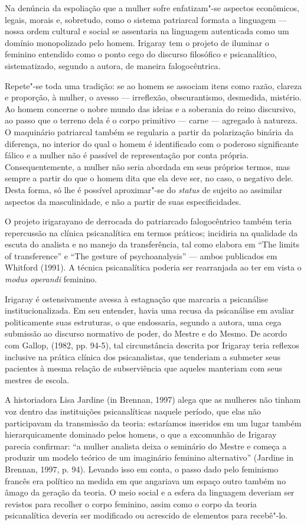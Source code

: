 Na denúncia da espoliação que a mulher sofre enfatizam"-se aspectos
econômicos, legais, morais e, sobretudo, como o sistema patriarcal
formata a linguagem --- nossa ordem cultural e social se assentaria na
linguagem autenticada como um domínio monopolizado pelo homem. Irigaray
tem o projeto de iluminar o feminino entendido como o ponto cego do
discurso filosófico e psicanalítico, sistematizado, segundo a autora, de
maneira falogocêntrica.

Repete"-se toda uma tradição: se ao homem se associam itens como razão,
clareza e proporção, à mulher, o avesso --- irreflexão, obscurantismo,
desmedida, mistério. Ao homem concerne o nobre mundo das ideias e a
soberania do reino discursivo, ao passo que o terreno dela é o corpo
primitivo --- carne --- agregado à natureza. O maquinário patriarcal
também se regularia a partir da polarização binária da diferença, no
interior do qual o homem é identificado com o poderoso significante
fálico e a mulher não é passível de representação por conta própria.
Consequentemente, a mulher não seria abordada em seus próprios termos,
mas sempre a partir do que o homem dita que ela deve ser, no caso, o
negativo dele. Desta forma, só lhe é possível aproximar"-se do
\emph{status} de sujeito ao assimilar aspectos da masculinidade, e não a
partir de suas especificidades.

O projeto irigarayano de derrocada do patriarcado falogocêntrico também
teria repercussão na clínica psicanalítica em termos práticos; incidiria
na qualidade da escuta do analista e no manejo da transferência, tal
como elabora em ``The limits of transference'' e ``The gesture of
psychoanalysis'' --- ambos publicados em Whitford (1991). A técnica
psicanalítica poderia ser rearranjada ao ter em vista o \emph{modus
operandi} feminino.

Irigaray é ostensivamente avessa à estagnação que marcaria a psicanálise
institucionalizada. Em seu entender, havia uma recusa da psicanálise em
avaliar politicamente suas estruturas, o que endossaria, segundo a
autora, uma cega submissão ao discurso normativo de poder, do Mestre e
do Mesmo. De acordo com Gallop, (1982, pp. 94-5), tal circunstância
descrita por Irigaray teria reflexos inclusive na prática clínica dos
psicanalistas, que tenderiam a submeter seus pacientes à mesma relação
de subserviência que aqueles manteriam com seus mestres de escola.

A historiadora Lisa Jardine (in Brennan, 1997) alega que as mulheres não
tinham voz dentro das instituições psicanalíticas naquele período, que
elas não participavam da transmissão da teoria: estaríamos inseridos em
um lugar também hierarquicamente dominado pelos homens, o que a
excomunhão de Irigaray parecia confirmar: ``a mulher analista deixa o
seminário do Mestre e começa a produzir um modelo teórico de um
imaginário feminino alternativo'' (Jardine in Brennan, 1997, p. 94).
Levando isso em conta, o passo dado pelo feminismo francês era político
na medida em que angariava um espaço outro também no âmago da geração da
teoria. O meio social e a esfera da linguagem deveriam ser revistos para
recolher o corpo feminino, assim como o corpo da teoria psicanalítica
deveria ser modificado ou acrescido de elementos para recebê"-lo.

